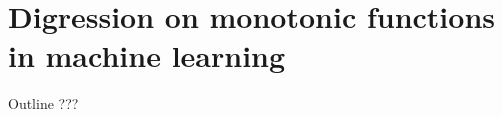 \chapter{Digression on monotonic functions in machine learning}\label{ch:05}

\begin{remark}{Outline}
???
\end{remark}
